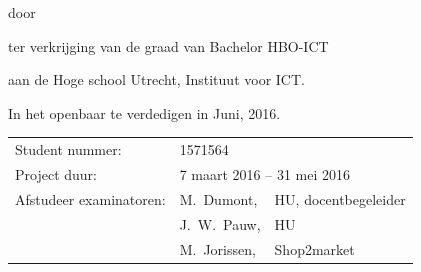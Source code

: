 \begin{titlepage}


\begin{center}


{\makeatletter
\largetitlestyle\fontsize{40}{60}\selectfont\@title
\makeatother}

{\makeatletter
\ifx\@subtitle\undefined\else
    \bigskip
   {\tudsffamily\fontsize{22}{32}\selectfont\@subtitle}    
\fi
\makeatother}

\bigskip
\bigskip

door

\bigskip
\bigskip

{\makeatletter
\largetitlestyle\fontsize{26}{26}\selectfont\@author
\makeatother}

\bigskip
\bigskip

ter verkrijging van de graad van Bachelor HBO-ICT

aan de Hoge school Utrecht, Instituut voor ICT.

In het openbaar te verdedigen in Juni, 2016.

\vfill

\begin{tabular}{lll}
    Student nummer: & 1571564 \\
    Project duur: & \multicolumn{2}{l}{7 maart 2016 -- 31 mei 2016} \\
    Afstudeer examinatoren:
        & M.\ Dumont, & HU, docentbegeleider \\
        & J.\ W.\ Pauw, & HU \\
        & M.\ Jorissen, & Shop2market
\end{tabular}




\end{center}


\end{titlepage}
